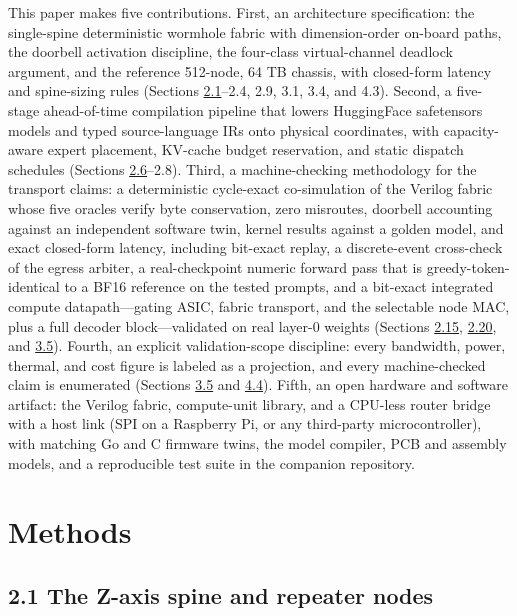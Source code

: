 \documentclass[10pt,twocolumn]{article}
\begin{document}
This paper makes five contributions. First, an architecture specification: the single-spine deterministic wormhole fabric with dimension-order on-board paths, the doorbell activation discipline, the four-class virtual-channel deadlock argument, and the reference 512-node, 64 TB chassis, with closed-form latency and spine-sizing rules (Sections \hyperref[sec:2.1]{2.1}--2.4, 2.9, 3.1, 3.4, and 4.3). Second, a five-stage ahead-of-time compilation pipeline that lowers HuggingFace safetensors models and typed source-language IRs onto physical coordinates, with capacity-aware expert placement, KV-cache budget reservation, and static dispatch schedules (Sections \hyperref[sec:2.6]{2.6}--2.8). Third, a machine-checking methodology for the transport claims: a deterministic cycle-exact co-simulation of the Verilog fabric whose five oracles verify byte conservation, zero misroutes, doorbell accounting against an independent software twin, kernel results against a golden model, and exact closed-form latency, including bit-exact replay, a discrete-event cross-check of the egress arbiter, a real-checkpoint numeric forward pass that is greedy-token-identical to a BF16 reference on the tested prompts, and a bit-exact integrated compute datapath---gating ASIC, fabric transport, and the selectable node MAC, plus a full decoder block---validated on real layer-0 weights (Sections \hyperref[sec:2.15]{2.15}, \hyperref[sec:2.20]{2.20}, and \hyperref[sec:3.5]{3.5}). Fourth, an explicit validation-scope discipline: every bandwidth, power, thermal, and cost figure is labeled as a projection, and every machine-checked claim is enumerated (Sections \hyperref[sec:3.5]{3.5} and \hyperref[sec:4.4]{4.4}). Fifth, an open hardware and software artifact: the Verilog fabric, compute-unit library, and a CPU-less router bridge with a host link (SPI on a Raspberry Pi, or any third-party microcontroller), with matching Go and C firmware twins, the model compiler, PCB and assembly models, and a reproducible test suite in the companion repository\cite{28}.

\section*{Methods}\label{sec:methods}

\subsection*{2.1 The Z-axis spine and repeater nodes}\label{sec:2.1}
\end{document}
